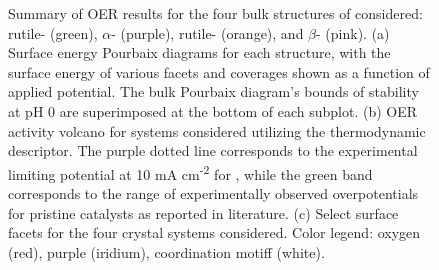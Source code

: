 \begin{figure}
\centering
{}
\caption{\label{fig:oer_volcano}
%
Summary of OER results for the four bulk structures of \IrOx considered: rutile- (green), $\alpha$- (purple), rutile- (orange), and $\beta$- (pink).
%
(a) Surface energy Pourbaix diagrams for each structure, with the surface energy of various facets and coverages shown as a function of applied potential.
%
The bulk Pourbaix diagram's bounds of stability at pH \num{0} are superimposed at the bottom of each subplot.
%
(b) OER activity volcano for \IrOx systems considered utilizing the \DGOmOH thermodynamic descriptor.
%
The purple dotted line corresponds to the experimental limiting potential at \num{10} mA cm\textsuperscript{-2} for  \cite{Seitz2016},
while the green band corresponds to the range of experimentally observed overpotentials for pristine  catalysts as reported in literature.
%
(c) Select surface facets for the four \IrOx crystal systems considered.
%
Color legend: oxygen (red), purple (iridium), coordination motiff (white).
}
\end{figure}




